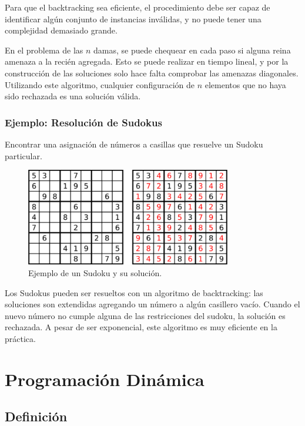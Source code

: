 \documentclass[a4paper]{report}
\begin{document}
Para que el backtracking sea eficiente, el procedimiento  debe ser capaz de identificar algún conjunto de instancias inválidas, y no puede tener una complejidad demasiado grande.

En el problema de las $n$ damas, se puede chequear en cada paso si alguna reina amenaza a la recién agregada. Esto se puede realizar en tiempo lineal, y por la construcción de las soluciones solo hace falta comprobar las amenazas diagonales. Utilizando este algoritmo, cualquier configuración de $n$ elementos que no haya sido rechazada es una solución válida.

\subsubsection{Ejemplo: Resolución de Sudokus}

\begin{problema}
    Encontrar una asignación de números a casillas que resuelve un Sudoku particular.
\end{problema}

\begin{figure}[H]
    \centering
    \includegraphics[width=0.8\textwidth]{sudoku.png}
    \caption*{Ejemplo de un Sudoku y su solución.}
\end{figure}

Los Sudokus pueden ser resueltos con un algoritmo de backtracking: las soluciones son extendidas agregando un número a algún casillero vacío. Cuando el nuevo número no cumple alguna de las restricciones del sudoku, la solución es rechazada. A pesar de ser exponencial, este algoritmo es muy eficiente en la práctica.

\section{Programación Dinámica}

\subsection{Definición}
\end{document}
